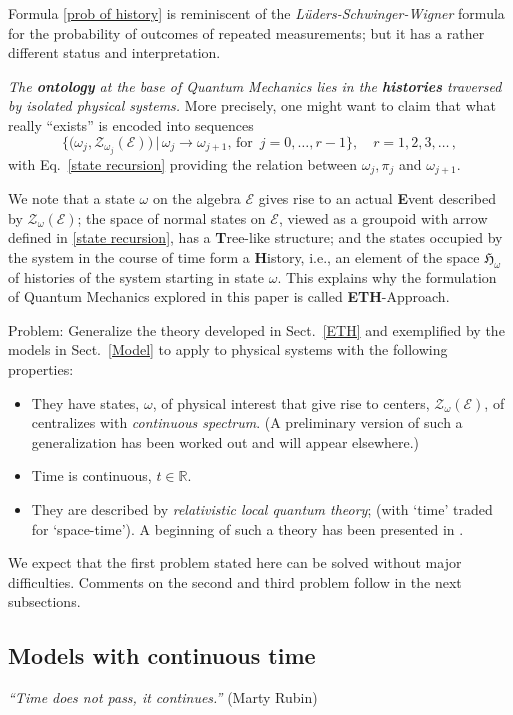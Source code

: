 \documentclass[12pt]{article}
\begin{document}
{Formula \eqref{prob of history} is reminiscent of the \textit{L\"uders-Schwinger-Wigner} formula \cite{LSW} for the probability of outcomes of repeated measurements; but it has a rather different status and interpretation.

\textit{The {\bf{ontology}} at the base of Quantum Mechanics lies in the {\bf{histories}} traversed by isolated physical systems.} More precisely, one might want to claim that what really ``exists'' is encoded into sequences
$$\Big\{ \Big(\omega_j, \mathcal{Z}_{\omega_j}(\mathcal{E}) \Big) \,\Big| \, \omega_j \rightarrow \omega_{j+1},\,\text{for }\, j=0, \dots, r-1\Big\}, \quad r=1,2,3,\dots\,,$$
with Eq.~\eqref{state recursion} providing the relation between $\omega_j, \pi_j$ and $\omega_{j+1}$.

We note that a state $\omega$ on the algebra $\mathcal{E}$ gives rise to an actual {\bf{E}}vent described by
$\mathcal{Z}_{\omega}(\mathcal{E})$; the space of normal states on $\mathcal{E}$, viewed as a groupoid with arrow
defined in \eqref{state recursion}, has a {\bf{T}}ree-like structure; and the states occupied by the system in the course of
time form a {\bf{H}}istory, i.e., an element of the space $\mathfrak{H}_{\omega}$ of histories of the system starting in
state $\omega$. This explains why the formulation of Quantum Mechanics explored in this paper is called
{\bf{ETH}}-Approach.

{Problem}: Generalize the theory developed in Sect.~\ref{ETH} and exemplified by the models in Sect.~\ref{Model} to apply to physical systems with the following properties:
\begin{itemize}
\item{They have states, $\omega$, of physical interest that give rise to centers, $\mathcal{Z}_{\omega}(\mathcal{E})$, of centralizes with \textit{continuous spectrum}. (A preliminary version of such a generalization has been worked out and will appear elsewhere.)}
\item{Time is continuous, $t\in \mathbb{R}$.}
\item{They are described by \textit{relativistic local quantum theory}; (with `time' traded for `space-time'). A beginning of such a theory has been presented in \cite{Fr2}.}
\end{itemize}
We expect that the first problem stated here can be solved without major difficulties. Comments on the second and third problem follow in the next subsections.

\subsection{Models with continuous time}
\hspace{0.5cm}\textit{``Time does not pass, it continues.''} (Marty Rubin)


}
\end{document}
